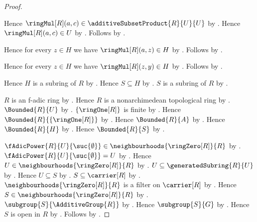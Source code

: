 \begin{proof}
\begin{subproof}
\begin{subproof}
\begin{subproof}
\begin{byCase}
\begin{byCase}
                                Hence $\ringMul[R](a,c)
                                    \in\additiveSubsetProduct{R}{U}{U}$ by
                                    .
                                Hence $\ringMul[R](a,c)\in U$ by
                                    .
                                Follows by .
                        \end{byCase}
                \end{byCase}
            \end{subproof}
            Hence for every $z\in H$ we have
                $\ringMul[R](a,z)\in H$ by
                .
            Follows by \auto.
        \end{subproof}
        Hence for every $z\in H$ we have
            $\ringMul[R](z,y)\in H$ by
            .
        Follows by \auto.
    \end{subproof}
    Hence $H$ is a subring of $R$ by .
    Hence $S\subseteq H$ by .
    $S$ is a subring of $R$ by .

    $R$ is an f-adic ring by .
    Hence $R$ is a nonarchimedean topological ring by
        .
    $\Bounded{R}{U}$ by .
    $\{\ringOne[R]\}$ is finite by .
    Hence $\Bounded{R}{\{\ringOne[R]\}}$ by
        .
    Hence $\Bounded{R}{A}$ by .
    Hence $\Bounded{R}{H}$ by
        .
    Hence $\Bounded{R}{S}$ by .

    $\fAdicPower{R}{U}{\suc{\emptyset}}
        \in\neighbourhoods{\ringZero[R]}{R}$ by
        .
    $\fAdicPower{R}{U}{\suc{\emptyset}}=U$ by
        .
    Hence $U\in\neighbourhoods{\ringZero[R]}{R}$ by \auto.
    $U\subseteq\generatedSubring{R}{U}$ by
        .
    Hence $U\subseteq S$ by \auto.
    $S\subseteq\carrier[R]$ by .
    $\neighbourhoods{\ringZero[R]}{R}$ is a filter on $\carrier[R]$ by
        .
    Hence $S\in\neighbourhoods{\ringZero[R]}{R}$ by .
    $\subgroup{S}{\AdditiveGroup{R}}$ by
        .
    Hence $\subgroup{S}{G}$ by \auto.
    Hence $S$ is open in $R$ by
        .
    Follows by \auto.
\end{proof}

